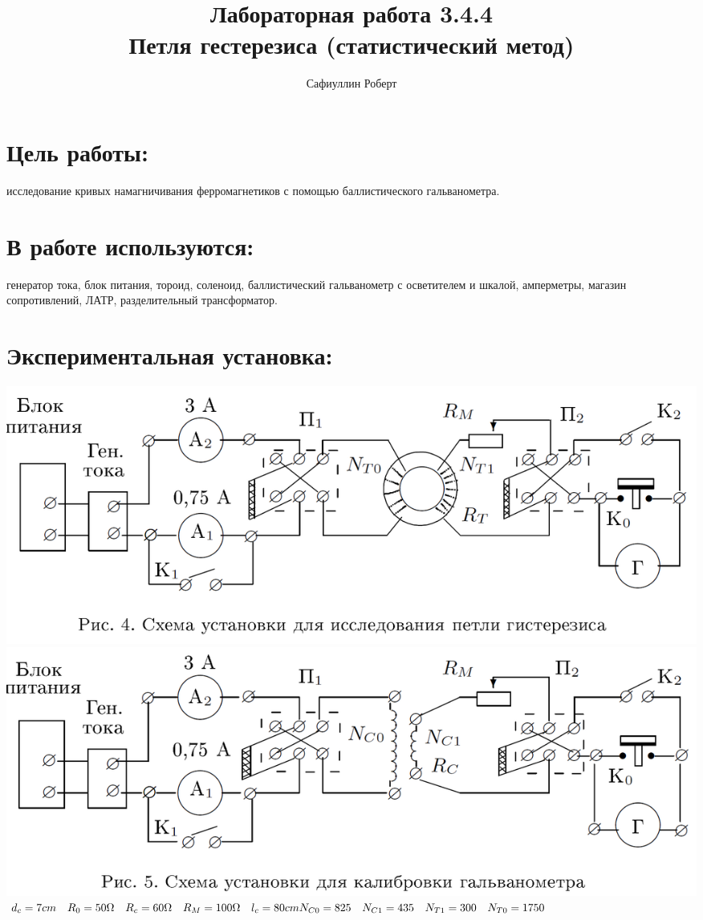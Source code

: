 \documentclass[a4paper,12pt]{article} %
\author{Сафиуллин Роберт	}
\title{Лабораторная работа 3.4.4\\ Петля гестерезиса
(статистический метод)}
\begin{document}

\maketitle


\newpage
\section{Цель работы:}
исследование кривых намагничивания ферромагнетиков с помощью баллистического гальванометра.
\\
\section{В работе используются:}
генератор тока, блок питания, тороид, соленоид, баллистический гальванометр с осветителем и шкалой, амперметры, магазин сопротивлений, ЛАТР, разделительный трансформатор.

 
\section{Экспериментальная установка:}
\includegraphics[scale=0.35]{ust}\\
\includegraphics[scale=0.35]{ust1}\\
$d_c=7 cm \quad
R_0=50 \Omega \quad
R_c=60 \Omega    \quad
           R_M=100 \Omega\quad
              l_c=80 cm \\
N_{C0}=825\quad
N_{C1}=435\quad
N_{T1}=300 \quad
N_{T0}=1750$
\end{document}
